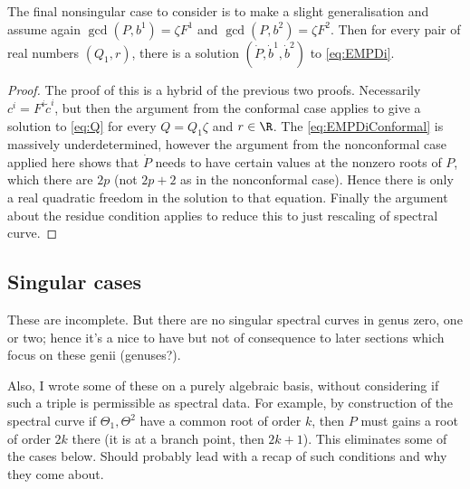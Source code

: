 














\begin{lem}
The final nonsingular case to consider is to make a slight generalisation and assume again $\gcd(P,b^1)=ζF^1$ and $\gcd(P,b^2)=ζF^2$. Then for every pair of real numbers $(Q_1,r)$, there is a solution $(\dot P, \dot b^1, \dot b^2)$ to \eqref{eq:EMPDi}.
\begin{proof}
The proof of this is a hybrid of the previous two proofs. Necessarily $c^i = F^i \tilde{c}^i$, but then the argument from the conformal case applies to give a solution to \eqref{eq:Q} for every $Q = Q_1ζ$ and $r\in\R$. The \eqref{eq:EMPDiConformal} is massively underdetermined, however the argument from the nonconformal case applied here shows that $\dot P$ needs to have certain values at the nonzero roots of $P$, which there are $2p$ (not $2p+2$ as in the nonconformal case). Hence there is only a real quadratic freedom in the solution to that equation. Finally the argument about the residue condition applies to reduce this to just rescaling of spectral curve.
\end{proof}
\end{lem}












\subsection{Singular cases}
\label{sub:Singular cases}
These are incomplete. But there are no singular spectral curves in genus zero, one or two; hence it's a nice to have but not of consequence to later sections which focus on these genii (genuses?).

Also, I wrote some of these on a purely algebraic basis, without considering if such a triple is permissible as spectral data. For example, by construction of the spectral curve if $Θ_1, Θ^2$ have a common root of order $k$, then $P$ must gains a root of order $2k$ there (it is at a branch point, then $2k+1$). This eliminates some of the cases below. Should probably lead with a recap of such conditions and why they come about.


